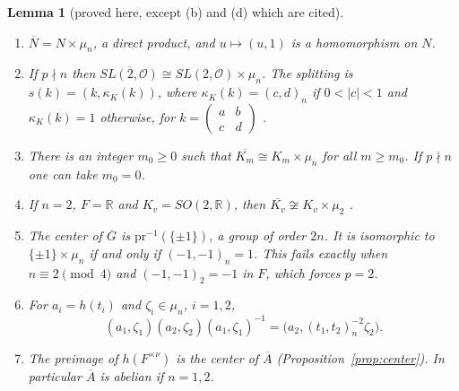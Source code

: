 \documentclass[12pt,letterpaper]{article}
\numberwithin{equation}{section}
\newtheorem{lemma}[theorem]{Lemma}
\theoremstyle{definition}
\newcommand{\proved}{proved here}
\newcommand{\cited}{cited}
\newcommand{\R}{\mathbb R}
\newcommand{\OF}{\mathcal O}
\newcommand{\bG}{\overline{G}}
\newcommand{\bA}{\overline{A}}
\newcommand{\pr}{\mathrm{pr}}
\begin{document}
\begin{lemma}[\proved, except (b) and (d) which are \cited]\label{lem:splittings}
\begin{enumerate}[label=(\alph*),leftmargin=*,itemsep=1pt]
\item $\overline N=N\times\mu_n$, a direct product, and $u\mapsto(u,1)$ is a homomorphism on $N$.
\item If $p\nmid n$ then $\overline{SL(2,\OF)}\cong SL(2,\OF)\times\mu_n$.  The splitting is
$s(k)=(k,\kappa_K(k))$, where $\kappa_K(k)=(c,d)_n$ if $0<|c|<1$ and $\kappa_K(k)=1$
otherwise, for $k=\begin{pmatrix}a&b\\c&d\end{pmatrix}$ \cite{Ku67}.
\item There is an integer $m_0\ge0$ such that $\overline{K_m}\cong K_m\times\mu_n$ for all
$m\ge m_0$.  If $p\nmid n$ one can take $m_0=0$.
\item If $n=2$, $F=\R$ and $K_v=SO(2,\R)$, then $\overline{K_v}\not\cong K_v\times\mu_2$
\cite{Ge76,Sa67}.
\item The center of $\bG$ is $\pr^{-1}(\{\pm1\})$, a group of order $2n$.
It is isomorphic to $\{\pm1\}\times\mu_n$ if and only if $(-1,-1)_n=1$.  This fails exactly
when $n\equiv2\pmod4$ and $(-1,-1)_2=-1$ in $F$, which forces $p=2$.
\item For $a_i=h(t_i)$ and $\zeta_i\in\mu_n$, $i=1,2$,
\[
(a_1,\zeta_1)(a_2,\zeta_2)(a_1,\zeta_1)^{-1}=\bigl(a_2,(t_1,t_2)_n^{-2}\zeta_2\bigr).
\]
\item The preimage of $h(F^{\times\nu})$ is the center of $\bA$
(Proposition~\ref{prop:center}).  In particular $\bA$ is abelian if $n=1,2$.
\end{enumerate}
\end{lemma}
\end{document}
